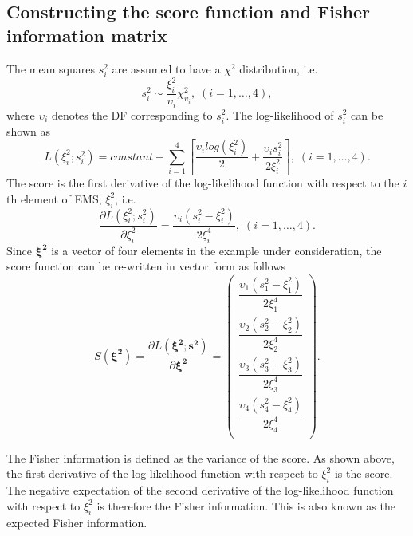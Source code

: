 \documentclass[12pt,a4paper]{article}
\begin{document}
\subsection{Constructing the score function and Fisher information matrix} 
The mean squares $s_i^2$ are assumed to have a $\chi^2$ distribution, i.e.\
\begin{equation}
s_i^2 \sim \dfrac{\xi_i^2}{\upsilon_i} \chi_{\upsilon_i}^2, \;  (i = 1,\dots,4), 
\end{equation}
where $\upsilon_i$ denotes the DF corresponding to $s_i^2$. The log-likelihood of $s_i^2$ can be shown as 
\[L(\xi_i^2;s_i^2) = constant - \sum_{i = 1}^{4}\left[ \dfrac{\upsilon_i log(\xi_i^2)}{2} + \dfrac{\upsilon_i s_i^2}{2\xi_i^2}\right], \;  (i = 1,\dots,4). \]   
The score is the first derivative of the log-likelihood function with respect to the $i$th element of EMS, $\xi_i^2$, i.e.\
\[\dfrac{\partial L(\xi_i^2;s_i^2)}{\partial \xi_i^2} = \dfrac{\upsilon_i (s_i^2 - \xi_i^2)}{2\xi_i^4}, \;  (i = 1,\dots,4).\]
Since $\bm{\xi^2}$ is a vector of four elements in the example under consideration, the score function can be re-written in vector form as follows
\begin{equation}\label{eq:scoreFunOld}
S(\bm{\xi^2}) = \dfrac{\partial L(\bm{\xi^2};\bm{s^2})}{\partial \bm{\xi^2}} = 
\begin{pmatrix}               
\dfrac{\upsilon_1 (s_1^2 - \xi_1^2)}{2\xi_1^4} \\
 \dfrac{\upsilon_2 (s_2^2 - \xi_2^2)}{2\xi_2^4} \\
 \dfrac{\upsilon_3 (s_3^2 - \xi_3^2)}{2\xi_3^4}  \\
\dfrac{\upsilon_4 (s_4^2 - \xi_4^2)}{2\xi_4^4}  \\
\end{pmatrix}.
\end{equation}

The Fisher information is defined as the variance of the score. As shown above, the first derivative of the log-likelihood function with respect to $\xi_i^2$ is the score. The negative expectation of the second derivative of the log-likelihood function with respect to $\xi_i^2$ is therefore the Fisher information. This is also known as the expected Fisher information.
\end{document}
